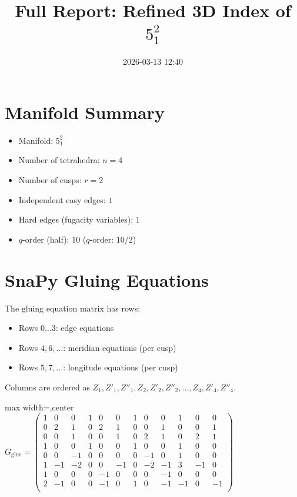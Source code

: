 \documentclass[11pt,a4paper]{article}
\title{Full Report: Refined 3D Index of $5_1^2$}
\date{2026-03-13 12:40}
\begin{document}
\maketitle
\tableofcontents
\newpage

\section{Manifold Summary}
\begin{itemize}
  \item Manifold: $5_1^2$
  \item Number of tetrahedra: $n = 4$
  \item Number of cusps: $r = 2$
  \item Independent easy edges: $1$
  \item Hard edges (fugacity variables): $1$
  \item $q$-order (half): $10$ \quad ($q$-order: $10/2$)
\end{itemize}

\section{SnaPy Gluing Equations}
The gluing equation matrix has rows:
\begin{itemize}
  \item Rows $0\ldots3$: edge equations
  \item Rows $4,6,\ldots$: meridian equations (per cusp)
  \item Rows $5,7,\ldots$: longitude equations (per cusp)
\end{itemize}
Columns are ordered as $Z_1, Z'_1, Z''_1, Z_2, Z'_2, Z''_2, \ldots, Z_4, Z'_4, Z''_4$.

\begin{adjustbox}{max width=\linewidth,center}
$\displaystyle G_{\text{glue}} = 
\left(\begin{array}{cccccccccccc}
1 & 0 & 0 & 1 & 0 & 0 & 1 & 0 & 0 & 1 & 0 & 0 \\
0 & 2 & 1 & 0 & 2 & 1 & 0 & 0 & 1 & 0 & 0 & 1 \\
0 & 0 & 1 & 0 & 0 & 1 & 0 & 2 & 1 & 0 & 2 & 1 \\
1 & 0 & 0 & 1 & 0 & 0 & 1 & 0 & 0 & 1 & 0 & 0 \\
0 & 0 & -1 & 0 & 0 & 0 & 0 & -1 & 0 & 1 & 0 & 0 \\
1 & -1 & -2 & 0 & 0 & -1 & 0 & -2 & -1 & 3 & -1 & 0 \\
1 & 0 & 0 & 0 & -1 & 0 & 0 & 0 & -1 & 0 & 0 & 0 \\
2 & -1 & 0 & 0 & -1 & 0 & 1 & 0 & -1 & -1 & 0 & -1 \\
\end{array}\right)$
\end{adjustbox}
\end{document}
